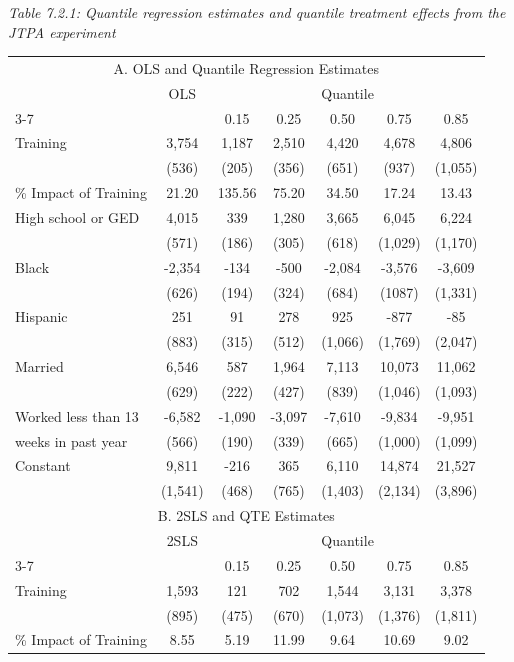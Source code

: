 \documentclass[11pt,a4paper]{article}
\begin{document}
\begin{center}\small
\textit{Table 7.2.1: Quantile regression estimates and quantile treatment effects from the JTPA experiment}\\[2pt]
\begin{tabular}{lcccccc}
\toprule
\multicolumn{7}{c}{A. OLS and Quantile Regression Estimates}\\
 & OLS & \multicolumn{5}{c}{Quantile}\\
\cmidrule(lr){3-7}
 & & 0.15 & 0.25 & 0.50 & 0.75 & 0.85\\
\midrule
Training & 3,754 & 1,187 & 2,510 & 4,420 & 4,678 & 4,806\\
 & (536) & (205) & (356) & (651) & (937) & (1,055)\\
\% Impact of Training & 21.20 & 135.56 & 75.20 & 34.50 & 17.24 & 13.43\\
High school or GED & 4,015 & 339 & 1,280 & 3,665 & 6,045 & 6,224\\
 & (571) & (186) & (305) & (618) & (1,029) & (1,170)\\
Black & -2,354 & -134 & -500 & -2,084 & -3,576 & -3,609\\
 & (626) & (194) & (324) & (684) & (1087) & (1,331)\\
Hispanic & 251 & 91 & 278 & 925 & -877 & -85\\
 & (883) & (315) & (512) & (1,066) & (1,769) & (2,047)\\
Married & 6,546 & 587 & 1,964 & 7,113 & 10,073 & 11,062\\
 & (629) & (222) & (427) & (839) & (1,046) & (1,093)\\
Worked less than 13 & -6,582 & -1,090 & -3,097 & -7,610 & -9,834 & -9,951\\
weeks in past year & (566) & (190) & (339) & (665) & (1,000) & (1,099)\\
Constant & 9,811 & -216 & 365 & 6,110 & 14,874 & 21,527\\
 & (1,541) & (468) & (765) & (1,403) & (2,134) & (3,896)\\
\midrule
\multicolumn{7}{c}{B. 2SLS and QTE Estimates}\\
 & 2SLS & \multicolumn{5}{c}{Quantile}\\
\cmidrule(lr){3-7}
 & & 0.15 & 0.25 & 0.50 & 0.75 & 0.85\\
\midrule
Training & 1,593 & 121 & 702 & 1,544 & 3,131 & 3,378\\
 & (895) & (475) & (670) & (1,073) & (1,376) & (1,811)\\
\% Impact of Training & 8.55 & 5.19 & 11.99 & 9.64 & 10.69 & 9.02\\

\end{tabular}
\end{center}
\end{document}
